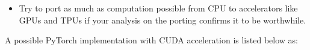 {\begin{itemize}
    numerical framework you are using. For a first exposure to vectorized operations you can have a look at \cite{Hager2010}. For in depth understanding of 
    computer architecture that leads to the vectorized operations please refer to either \cite{Patterson2014} or \cite{Hennessy2019}.
    \item Try to port as much as computation possible from \ac{CPU} to accelerators like \ac{GPU}s and \ac{TPU}s if 
    your analysis on the porting confirms it to be worthwhile.
  \end{itemize}
  A possible PyTorch\cite{Paszke2019} implementation with \ac{CUDA}\cite{Nvidia} acceleration is listed below as:
  \label{code:irwf}    
\clearpage %
}
